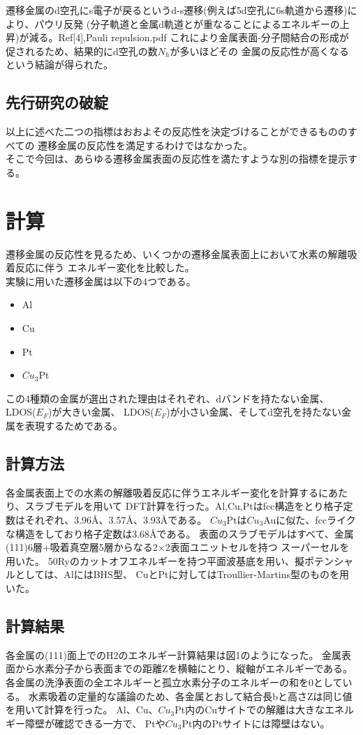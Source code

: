 \documentclass[12pt]{ltjsarticle}
\begin{document}
遷移金属のd空孔にs電子が戻るというd-s遷移(例えば5d空孔に6s軌道から遷移)により、パウリ反発
(分子軌道と金属d軌道とが重なることによるエネルギーの上昇)が減る。Ref[4],Pauli repulsion.pdf
これにより金属表面-分子間結合の形成が促されるため、結果的にd空孔の数$N_h$が多いほどその
金属の反応性が高くなるという結論が得られた。

\subsection{先行研究の破綻}
以上に述べた二つの指標はおおよその反応性を決定づけることができるもののすべての
遷移金属の反応性を満足するわけではなかった。\\
そこで今回は、あらゆる遷移金属表面の反応性を満たすような別の指標を提示する。

\section{計算}
遷移金属の反応性を見るため、いくつかの遷移金属表面上において水素の解離吸着反応に伴う
エネルギー変化を比較した。\\
実験に用いた遷移金属は以下の4つである。

\begin{itemize}
 \item Al
 \item Cu
 \item Pt
 \item $Cu_{3}$Pt
\end{itemize}

この4種類の金属が選出された理由はそれぞれ、dバンドを持たない金属、LDOS($E_F$)が大きい金属、
LDOS($E_F$)が小さい金属、そしてd空孔を持たない金属を表現するためである。

\subsection{計算方法}
各金属表面上での水素の解離吸着反応に伴うエネルギー変化を計算するにあたり、スラブモデルを用いて
DFT計算を行った。Al,Cu,Ptはfcc構造をとり格子定数はそれぞれ、3.96$\mbox{\AA}$、3.57$\mbox{\AA}$、3.93$\mbox{\AA}$である。
$Cu_3$Ptは$Cu_3$Auに似た、fccライクな構造をしており格子定数は3.68$\mbox{\AA}$である。
表面のスラブモデルはすべて、金属(111)6層+吸着真空層5層からなる2×2表面ユニットセルを持つ
スーパーセルを用いた。
50Ryのカットオフエネルギーを持つ平面波基底を用い、擬ポテンシャルとしては、AlにはBHS型、
CuとPtに対してはTroullier-Martins型のものを用いた。

\subsection{計算結果}
各金属の(111)面上でのH2のエネルギー計算結果は図1のようになった。  
金属表面から水素分子から表面までの距離Zを横軸にとり、縦軸がエネルギーである。
各金属の洗浄表面の全エネルギーと孤立水素分子のエネルギーの和を0としている。
水素吸着の定量的な議論のため、各金属とおして結合長bと高さZは同じ値を用いて計算を行った。
Al、Cu、$Cu_3$Pt内のCuサイトでの解離は大きなエネルギー障壁が確認できる一方で、
Ptや$Cu_3$Pt内のPtサイトには障壁はない。
\end{document}
